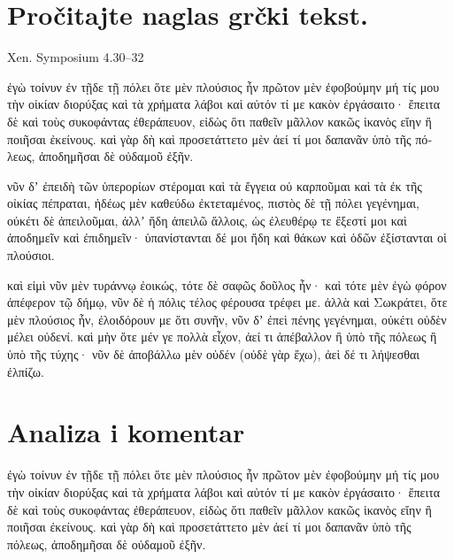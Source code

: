 
\section*{Pročitajte naglas grčki tekst.}

Xen. Symposium 4.30–32


\medskip


{\large

\begin{greek}

\noindent ἐγὼ τοίνυν ἐν τῇδε τῇ πόλει ὅτε μὲν πλούσιος ἦν πρῶτον μὲν ἐφοβούμην μή τίς μου τὴν οἰκίαν διορύξας καὶ τὰ χρήματα λάβοι καὶ αὐτόν τί με κακὸν ἐργάσαιτο· ἔπειτα δὲ καὶ τοὺς συκοφάντας ἐθεράπευον, εἰδὼς ὅτι παθεῖν μᾶλλον κακῶς ἱκανὸς εἴην ἢ ποιῆσαι ἐκείνους. καὶ γὰρ δὴ καὶ προσετάττετο μὲν ἀεί τί μοι δαπανᾶν ὑπὸ τῆς πόλεως, ἀποδημῆσαι δὲ οὐδαμοῦ ἐξῆν.

\noindent νῦν δʼ ἐπειδὴ τῶν ὑπερορίων στέρομαι καὶ τὰ ἔγγεια οὐ καρποῦμαι καὶ τὰ ἐκ τῆς οἰκίας πέπραται, ἡδέως μὲν καθεύδω ἐκτεταμένος, πιστὸς δὲ τῇ πόλει γεγένημαι, οὐκέτι δὲ ἀπειλοῦμαι, ἀλλʼ ἤδη ἀπειλῶ ἄλλοις, ὡς ἐλευθέρῳ τε ἔξεστί μοι καὶ ἀποδημεῖν καὶ ἐπιδημεῖν· ὑπανίστανται δέ μοι ἤδη καὶ θάκων καὶ ὁδῶν ἐξίστανται οἱ πλούσιοι.

\noindent καὶ εἰμὶ νῦν μὲν τυράννῳ ἐοικώς, τότε δὲ σαφῶς δοῦλος ἦν· καὶ τότε μὲν ἐγὼ φόρον ἀπέφερον τῷ δήμῳ, νῦν δὲ ἡ πόλις τέλος φέρουσα τρέφει με. ἀλλὰ καὶ Σωκράτει, ὅτε μὲν πλούσιος ἦν, ἐλοιδόρουν με ὅτι συνῆν, νῦν δʼ ἐπεὶ πένης γεγένημαι, οὐκέτι οὐδὲν μέλει οὐδενί. καὶ μὴν ὅτε μέν γε πολλὰ εἶχον, ἀεί τι ἀπέβαλλον ἢ ὑπὸ τῆς πόλεως ἢ ὑπὸ τῆς τύχης· νῦν δὲ ἀποβάλλω μὲν οὐδέν (οὐδὲ γὰρ ἔχω), ἀεὶ δέ τι λήψεσθαι ἐλπίζω. 

\end{greek}

}


\section*{Analiza i komentar}


{\large
\begin{greek}
\noindent ἐγὼ τοίνυν 
ἐν τῇδε τῇ πόλει 
ὅτε μὲν πλούσιος ἦν 
πρῶτον μὲν ἐφοβούμην 
μή τίς μου τὴν οἰκίαν διορύξας 
καὶ τὰ χρήματα λάβοι 
καὶ αὐτόν τί με κακὸν ἐργάσαιτο· 
ἔπειτα δὲ  
καὶ τοὺς συκοφάντας ἐθεράπευον, 
εἰδὼς ὅτι παθεῖν μᾶλλον κακῶς 
ἱκανὸς εἴην 
ἢ ποιῆσαι ἐκείνους. 
καὶ γὰρ δὴ καὶ 
προσετάττετο μὲν ἀεί 
τί μοι δαπανᾶν 
ὑπὸ τῆς πόλεως, 
ἀποδημῆσαι δὲ οὐδαμοῦ 
ἐξῆν.

\end{greek}
}

